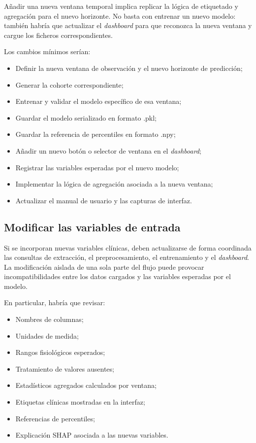 \documentclass[
  spanish,
  a4paper,
  12pt,
  twoside]{memoir}
\newcommand{\ruta}[1]{{\sffamily #1}}
\begin{document}
Añadir una nueva ventana temporal implica replicar la lógica de etiquetado y agregación para el nuevo horizonte. No basta con entrenar un nuevo modelo: también habría que actualizar el \textit{dashboard} para que reconozca la nueva ventana y cargue los ficheros correspondientes.

Los cambios mínimos serían:

\begin{itemize}
  \item Definir la nueva ventana de observación y el nuevo horizonte de predicción;
  \item Generar la cohorte correspondiente;
  \item Entrenar y validar el modelo específico de esa ventana;
  \item Guardar el modelo serializado en formato \ruta{.pkl};
  \item Guardar la referencia de percentiles en formato \ruta{.npy};
  \item Añadir un nuevo botón o selector de ventana en el \textit{dashboard};
  \item Registrar las variables esperadas por el nuevo modelo;
  \item Implementar la lógica de agregación asociada a la nueva ventana;
  \item Actualizar el manual de usuario y las capturas de interfaz.
\end{itemize}

\subsection*{Modificar las variables de entrada}

Si se incorporan nuevas variables clínicas, deben actualizarse de forma coordinada las consultas de extracción, el preprocesamiento, el entrenamiento y el 
\textit{dashboard}. La modificación aislada de una sola parte del flujo puede provocar incompatibilidades entre los datos cargados y las variables esperadas por el 
modelo.

En particular, habría que revisar:

\begin{itemize}
  \item Nombres de columnas;
  \item Unidades de medida;
  \item Rangos fisiológicos esperados;
  \item Tratamiento de valores ausentes;
  \item Estadísticos agregados calculados por ventana;
  \item Etiquetas clínicas mostradas en la interfaz;
  \item Referencias de percentiles;
  \item Explicación SHAP asociada a las nuevas variables.
\end{itemize}
\end{document}
